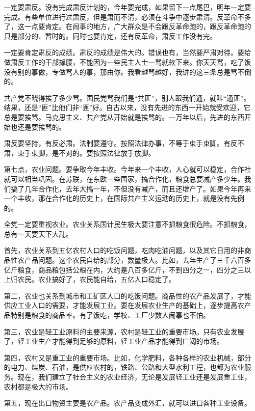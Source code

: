 一定要肃反。没有完成肃反计划的，今年要完成，如果留下一点尾巴，明年一定要完成。有些单位进行过肃反，但是肃而不清，必须在斗争中逐步肃清。反革命不多了，这一点要肯定。在闹事的地方，广大群众是不会跟反革命跑的，跟反革命跑的只是部分的、暂时的。同时也要肯定，还有反革命，肃反工作没有完。

一定要肯定肃反的成绩。肃反的成绩是伟大的。错误也有，当然要严肃对待。要给做肃反工作的干部撑腰，不能因为一些民主人士一骂就软下来。你天天骂，吃了饭没有别的事做，专做骂人的事，那由你。我看越骂越好，我讲的这三条总是骂不倒的。

共产党不晓得挨了多少骂。国民党骂我们是“共匪”，别人跟我们通，就叫“通匪”。结果，还是“匪”比他们非“匪”好。自古以来，没有先进的东西一开始就受欢迎，它总是要挨骂。马克思主义、共产党从开始就是挨骂的。一万年以后，先进的东西开始也还是要挨骂的。

肃反要坚持，有反必肃。法制要遵守。按照法律办事，不等于束手束脚。有反不肃，束手束脚，是不对的。要按照法律放手放脚。

第七点，农业问题。要争取今年丰收。今年来一个丰收，人心就可以稳定，合作社就可以相当巩固。在苏联，在东欧一些国家，搞合作化，粮食总要减产多少年。我们搞了几年合作化，去年大搞一年，不但没有减产，而且还增产了。如果今年再来一个丰收，那在合作化的历史上，在国际共产主义运动的历史上，就是没有先例的。

全党一定要重视农业。农业关系国计民生极大要注意不抓粮食很危险。不抓粮食，总有一天要天下大乱。

首先，农业关系到五亿农村人口的吃饭问题，吃肉吃油问题，以及其它日用的非商品性农产品问题。这个农民自给的部分，数量极大。比如，去年生产了三千六百多亿斤粮食，商品粮包括公粮在内，大约是八百多亿斤，不到四分之一，四分之三以上归农民。农业搞好了，农民能自给，五亿人口稳定了。

第二，农业也关系到城市和工矿区人口的吃饭问题。商品性的农产品发展了，才能供应工业人口的需要，才能发展工业。要在发展农业生产的基础上，逐步提高农产品特别是粮食的商品率。有了饭吃，学校、工厂少数人闹事也不怕。

第三，农业是轻工业原料的主要来源，农村是轻工业的重要市场。只有农业发展了，轻工业生产才能得到足够的原料，轻工业产品才能得到广阔的市场。

第四，农村又是重工业的重要市场。比如，化学肥料，各种各样的农业机械，部分的电力、煤炭、石油，是供应农村的，铁路、公路和大型水利工程，也都为农业服务。现在，我们建立了社会主义的农业经济，无论是发展轻工业还是发展重工业，农村都是极大的市场。

第五，现在出口物资主要是农产品。农产品变成外汇，就可以进口各种工业设备。

